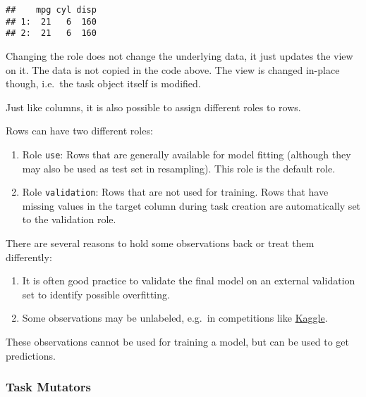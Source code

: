 \documentclass[
]{scrbook}
\newenvironment{Shaded}{\begin{snugshade}}{\end{snugshade}}
\newcommand{\AttributeTok}[1]{\textcolor[rgb]{0.77,0.63,0.00}{#1}}
\newcommand{\CommentTok}[1]{\textcolor[rgb]{0.56,0.35,0.01}{\textit{#1}}}
\newcommand{\DecValTok}[1]{\textcolor[rgb]{0.00,0.00,0.81}{#1}}
\newcommand{\FunctionTok}[1]{\textcolor[rgb]{0.00,0.00,0.00}{#1}}
\newcommand{\NormalTok}[1]{#1}
\newcommand{\SpecialCharTok}[1]{\textcolor[rgb]{0.00,0.00,0.00}{#1}}
\providecommand{\tightlist}{%
  \setlength{\itemsep}{0pt}\setlength{\parskip}{0pt}}
\renewenvironment{Shaded} {\begin{snugshade}\small} {\end{snugshade}}
\begin{document}
\begin{Shaded}
\end{Shaded}

\begin{verbatim}
##    mpg cyl disp
## 1:  21   6  160
## 2:  21   6  160
\end{verbatim}

Changing the role does not change the underlying data, it just updates the view on it.
The data is not copied in the code above.
The view is changed in-place though, i.e.~the task object itself is modified.

Just like columns, it is also possible to assign different roles to rows.

Rows can have two different roles:

\begin{enumerate}
\def\labelenumi{\arabic{enumi}.}
\item
  Role \texttt{use}:
  Rows that are generally available for model fitting (although they may also be used as test set in resampling).
  This role is the default role.
\item
  Role \texttt{validation}:
  Rows that are not used for training.
  Rows that have missing values in the target column during task creation are automatically set to the validation role.
\end{enumerate}

There are several reasons to hold some observations back or treat them differently:

\begin{enumerate}
\def\labelenumi{\arabic{enumi}.}
\tightlist
\item
  It is often good practice to validate the final model on an external validation set to identify possible overfitting.
\item
  Some observations may be unlabeled, e.g.~in competitions like \href{https://www.kaggle.com/}{Kaggle}.
\end{enumerate}

These observations cannot be used for training a model, but can be used to get predictions.

\hypertarget{tasks-mutators}{%
\subsubsection{Task Mutators}\label{tasks-mutators}}
\end{document}

